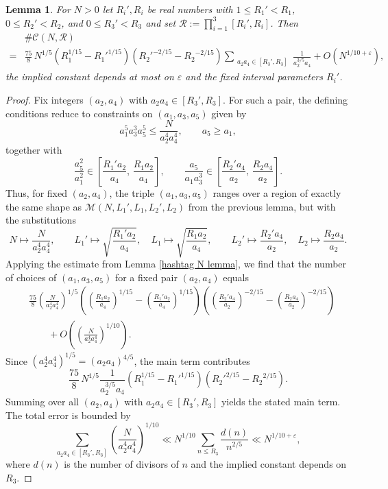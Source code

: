 \documentclass[table]{amsart}
\newtheorem{lemma}[theorem]{Lemma}
\numberwithin{equation}{section}
\begin{document}
\begin{lemma}
For $N>0$ let $R_i',R_i$ be real numbers with
$1\le R_1'<R_1$, $0\le R_2'<R_2$, and $0\le R_3'<R_3$ and set $\mathscr{R}:=\prod_{i=1}^3[R_i',R_i]$.
Then
\[
\begin{split}& \#\mathcal{C}(N,\mathscr{R})\\
=&
\frac{75}{8}\,N^{1/5} \left(R_1^{1/15}
- {R_1'}^{1/15}\right)\left(R_2'^{-2/15}
- {R_2}^{-2/15}\right)
\sum_{\substack{a_2 a_4\in [R_3',R_3]}}
\frac{1}{a_2^{3/5} a_4}
+
O\!\left(N^{1/10+\varepsilon}\right),
\end{split}
\]
the implied constant depends at most on $\varepsilon$ and the fixed
interval parameters $R_i'$.
\end{lemma}

\begin{proof}
Fix integers $(a_2,a_4)$ with $a_2 a_4\in [R_3',R_3]$.
For such a pair, the defining conditions reduce to constraints on
$(a_1,a_3,a_5)$ given by
\[
a_1^5 a_3^3 a_5^5 \le \frac{N}{a_2^4 a_4^4},
\qquad a_5\ge a_1,
\]
together with
\[
\frac{a_5^2}{a_1^2}\in
\left[\frac{R_1' a_2}{a_4},\,\frac{R_1 a_2}{a_4}\right],
\qquad
\frac{a_5}{a_1 a_3^3}\in
\left[\frac{R_2' a_4}{a_2},\,\frac{R_2 a_4}{a_2}\right].
\]
Thus, for fixed $(a_2,a_4)$, the triple $(a_1,a_3,a_5)$ ranges over a region
of exactly the same shape as $\mathcal{M}(N,L_1',L_1,L_2',L_2)$ from the
previous lemma, but with the substitutions
\[
N \mapsto \frac{N}{a_2^4 a_4^4},\qquad
L_1' \mapsto \sqrt{\frac{R_1' a_2}{a_4}},\quad
L_1 \mapsto \sqrt{\frac{R_1 a_2}{a_4}},\qquad
L_2' \mapsto \frac{R_2' a_4}{a_2},\quad
L_2 \mapsto \frac{R_2 a_4}{a_2}.
\]
Applying the estimate from Lemma \ref{hashtag N lemma}, we find that the number of choices of $(a_1, a_3, a_5)$ for a fixed pair $(a_2,a_4)$ equals 
\begin{align*}
&\frac{75}{8}
\left(\frac{N}{a_2^4 a_4^4}\right)^{1/5}
\left(
\left(\frac{R_1 a_2}{a_4}\right)^{1/15}
-
\left(\frac{R_1' a_2}{a_4}\right)^{1/15}
\right)
\left(
\left(\frac{R_2' a_4}{a_2}\right)^{-2/15}
-
\left(\frac{R_2 a_4}{a_2}\right)^{-2/15}
\right) \\
&\qquad
+ O\!\left(\left(\frac{N}{a_2^4 a_4^4}\right)^{1/10}\right).
\end{align*}
Since $(a_2^4 a_4^4)^{1/5}=(a_2 a_4)^{4/5}$, the main term contributes
\[
\frac{75}{8}\,N^{1/5}
\frac{1}{a_2^{3/5} a_4}\left(R_1^{1/15}-{R_1'}^{1/15}\right)\left(R_2'^{2/15}-{R_2}^{2/15}\right).
\]
Summing over all $(a_2,a_4)$ with $a_2 a_4\in [R_3',R_3]$ yields the stated
main term. The total error is bounded by
\[
\sum_{a_2 a_4\in [R_3',R_3]}
\left(\frac{N}{a_2^4 a_4^4}\right)^{1/10}
\ll
N^{1/10}
\sum_{n\le R_3} \frac{d(n)}{n^{2/5}}
\ll
N^{1/10+\varepsilon},
\]
where $d(n)$ is the number of divisors of $n$ and the implied constant depends on $R_3$.
\end{proof}
\end{document}
